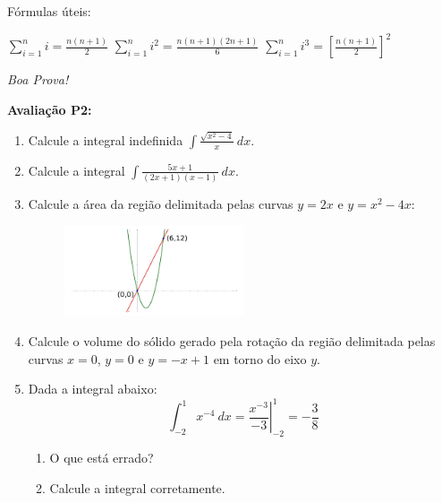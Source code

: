 \documentclass[a4paper,5pt]{amsbook}
\newcommand{\ds}{\displaystyle}
\begin{document}
\vspace{0.5cm}
F\'ormulas \'uteis:

$\ds\sum_{i=1}^n i = \frac{n(n+1)}{2}$\hspace{2cm}
$\ds\sum_{i=1}^n i^2 = \frac{n(n+1)(2n+1)}{6}$\hspace{2cm}
$\ds\sum_{i=1}^n i^3 = {\left[\frac{n(n+1)}{2}\right]}^2$
\begin{flushright}
	\vspace{0.3cm}
	\textit{Boa Prova!}
\end{flushright}

\newpage{}
\thispagestyle{empty}
\textbf{Avalia\c{c}\~ao P2:}
\begin{enumerate}
	\vspace{0.5cm}
	\item Calcule a integral indefinida $\ds\int \frac{\sqrt{x^2-4}}{x}\ dx$.
	\vspace{0.5cm}
	\item Calcule a integral $\ds\int \frac{5x+1}{(2x+1)(x-1)}\ dx$.
	\vspace{0.5cm}
	\item Calcule a \'area da regi\~ao delimitada pelas curvas $y=2x$ e $y = x^2-4x$:
		\begin{figure}[h]
			\includegraphics[width=0.5\textwidth]{p2-3.pdf}
		\end{figure}
	\vspace{0.5cm}
	\item Calcule o volume do s\'olido gerado pela rota\c{c}\~ao da regi\~ao delimitada
		pelas curvas $x = 0$, $y = 0$ e $y = -x+1$ em torno do eixo $y$.
	\vspace{0.5cm}
	\item Dada a integral abaixo:
		\[\int_{-2}^1 x^{-4}\ dx = \left. \frac{x^{-3}}{-3} \right|_{-2}^1 = -\frac{3}{8}\]
		\begin{enumerate}
			\vspace{0.3cm}
			\item O que est\'a errado?
			\vspace{0.3cm}
			\item Calcule a integral corretamente.
		\end{enumerate}
\end{enumerate}
\end{document}
